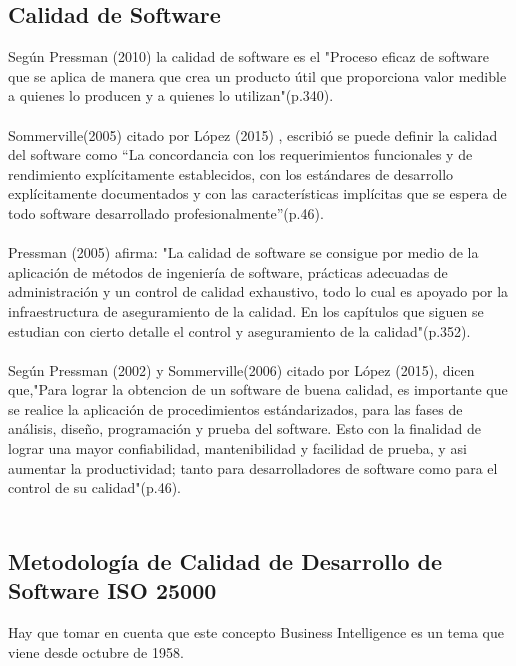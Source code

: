 \documentclass[preprint,12pt]{elsarticle}
\begin{document}
	\subsection{\textbf{Calidad de Software}}
Según Pressman (2010) la calidad de software es el "Proceso eficaz de software que se aplica de manera que crea un producto útil que proporciona valor medible a quienes lo producen y a quienes lo utilizan"(p.340).\cite{referenciatorres1}
\\
\\
Sommerville(2005) citado por López (2015) , escribió se puede definir la calidad del software como “La concordancia con los requerimientos funcionales y de rendimiento explícitamente establecidos, con los estándares de desarrollo explícitamente documentados y con las características implícitas que se espera de todo software desarrollado profesionalmente”(p.46).\cite{referenciatorres2}
\\
\\
Pressman (2005) afirma: "La calidad de software se consigue por medio de la aplicación de métodos de ingeniería de software, prácticas adecuadas de administración y un control de calidad exhaustivo, todo lo cual es apoyado por la infraestructura de aseguramiento de la calidad. En los capítulos que siguen se estudian con cierto detalle el control y aseguramiento de la calidad"(p.352).\cite{referenciatorres1}
\\
\\
Según Pressman (2002) y Sommerville(2006) citado por López (2015), dicen que,"Para lograr la obtencion de un software de buena calidad, es importante que se realice la aplicación de procedimientos estándarizados, para las fases de análisis, diseño, programación y prueba del software. Esto con la finalidad de lograr una mayor confiabilidad, mantenibilidad y facilidad de prueba, y asi aumentar la productividad; tanto para desarrolladores de software como para el control de su calidad"(p.46).\cite{referenciatorres2}
\\
\\
	\subsection{\textbf{Metodología de Calidad de Desarrollo de Software ISO 25000}}
	Hay que tomar en cuenta que este concepto Business Intelligence es un tema que viene desde octubre de 1958.
\\

\end{document}
